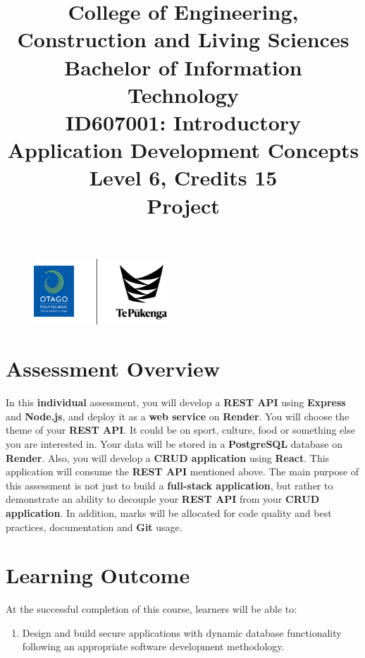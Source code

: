 \documentclass{article}
\author{}
\begin{document}
\begin{figure}
	\centering
	\includegraphics[width=50mm]{../img/logo.png}
\end{figure}

\title{College of Engineering, Construction and Living Sciences\\Bachelor of Information Technology\\ID607001: Introductory Application Development Concepts\\Level 6, Credits 15\\\textbf{Project}}
\date{}
\maketitle

\section*{Assessment Overview}
In this \textbf{individual} assessment, you will develop a \textbf{REST API} using \textbf{Express} and \textbf{Node.js}, and deploy it as a \textbf{web service} on \textbf{Render}. You will choose the theme of your \textbf{REST API}. It could be on sport, culture, food or something else you are interested in. Your data will be stored in a \textbf{PostgreSQL} database on \textbf{Render}. Also, you will develop a \textbf{CRUD application} using \textbf{React}. This application will consume the \textbf{REST API} mentioned above. The main purpose of this assessment is not just to build a \textbf{full-stack application}, but rather to demonstrate an ability to decouple your \textbf{REST API} from your \textbf{CRUD application}. In addition, marks will be allocated for code quality and best practices, documentation and \textbf{Git} usage.

\section*{Learning Outcome}
At the successful completion of this course, learners will be able to:
\begin{enumerate}
	\item Design and build secure applications with dynamic database functionality following an appropriate software development methodology.
\end{enumerate}
\end{document}
